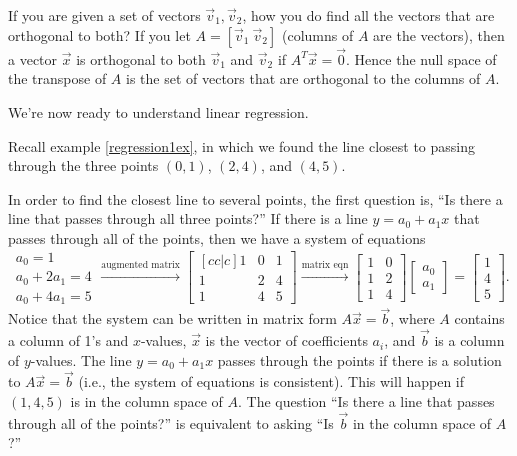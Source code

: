 If you are given a set of vectors $\vec v_1,\vec v_2$, how you do find all the vectors that are orthogonal to both?  
If you let $A = [\vec v_1\ \vec v_2]$ (columns of $A$ are the vectors), then a vector $\vec x$ is orthogonal to both $\vec v_1$ and $\vec v_2$ if $A^T\vec x=\vec 0$.
Hence the null space of the transpose of $A$ is the set of vectors that are orthogonal to the columns of $A$.

We're now ready to understand linear regression.


\begin{example}
Recall example \ref{regression1ex}, in which we found the line closest
to passing through the three points $(0,1)$, $(2,4)$, and $(4,5)$.  

In order to find the closest line to several points, the first question is, ``Is there a line that passes through all three points?''  If there is a line $y=a_0+a_1x$ that passes through all of the points, then we have a system of equations
\begin{equation*}
\begin{matrix}a_0=1\\a_0+2a_1=4\\a_0+4a_1=5\end{matrix}
\xrightarrow{\text{augmented matrix}}
\begin{bmatrix}[cc|c]1&0&1\\1&2&4\\1&4&5\end{bmatrix}
\xrightarrow{\text{matrix eqn}}
\begin{bmatrix}1&0\\1&2\\1&4\end{bmatrix}
\begin{bmatrix}a_0\\a_1\end{bmatrix}
=\begin{bmatrix}1\\4\\5\end{bmatrix}.
\end{equation*}
Notice that the system can be written in matrix form $A\vec x = \vec b$, where $A$ contains a column of 1's and $x$-values, $\vec x$ is the vector of coefficients $a_i$, and $\vec b$ is a column of $y$-values.  
%
The line $y=a_0+a_1x$ passes through the points if there is a solution to $A\vec x=\vec b$ (i.e., the system of equations is consistent).  This will happen if $(1,4,5)$ is in the column space of $A$.  The question ``Is there a line that passes through all of the points?'' is equivalent to asking ``Is $\vec b$ in the column space of $A$?''


\end{example}
